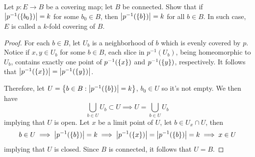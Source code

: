 \documentclass[12pt,a4paper]{article}
\begin{document}
    \begin{ex}
        Let $p:E\to B$ be a covering map; let $B$ be connected. Show that if $\left\lvert p^{-1}(\left\{ b_0 \right\}) \right\rvert=k$ for some $b_0\in B$, then $\left\lvert p^{-1}(\left\{ b \right\}) \right\rvert=k$ for all $b\in B$. In such case, $E$ is called a $k$-fold covering of $B$.
    \end{ex}
    \begin{proof}
        For each $b\in B$, let $U_b$ is a neighborhood of $b$ which is evenly covered by $p$. Notice if $x,y\in U_b$ for some $b\in B$, each slice in $p^{-1}(U_b)$, being homeomorphic to $U_b$, contains exactly one point of $p^{-1}(\left\{ x \right\})$ and $p^{-1}(\left\{ y \right\})$, respectively. It follows that $\left\lvert p^{-1}(\left\{ x \right\}) \right\rvert=\left\lvert p^{-1}(\left\{ y \right\}) \right\rvert$.

        Therefore, let $U=\left\{ b\in B:\left\lvert p^{-1}(\left\{ b \right\}) \right\rvert=k \right\}$, $b_0\in U$ so it's not empty. We then have
        \[
            \bigcup_{b\in U}U_b\subset U\implies U=\bigcup_{b\in U}U_b
        \]
        implying that $U$ is open. Let $x$ be a limit point of $U$, let $b\in U_x\cap U$, then
        \[
            b\in U\implies \left\lvert p^{-1}(\left\{ b \right\}) \right\rvert=k\implies \left\lvert p^{-1}(\left\{ x \right\}) \right\rvert=\left\lvert p^{-1}(\left\{ b \right\}) \right\rvert=k\implies x\in U
        \]
        implying that $U$ is closed. Since $B$ is connected, it follows that $U=B$.
    \end{proof}
    \bigskip
\end{document}
